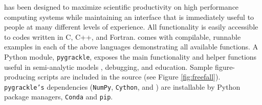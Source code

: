 \grackle{} has been designed to maximize scientific productivity on
high performance computing systems while maintaining an interface that
is immediately useful to people at many different levels of
experience.
All functionality is easily accessible to codes written
in C, C++, and Fortran.  \grackle{} comes with compilable,
runnable examples in each of the above languages demonstrating all
available functions.  A Python module, \texttt{pygrackle},
exposes the main functionality and helper functions useful in
semi-analytic models \citep[e.g.,][]{2016ApJ...820...71C,
  2016MNRAS.459.4209A}, debugging, and education.  Sample
figure-producing scripts are included in the source (see Figure
\ref{fig:freefall}). \texttt{pygrackle's}
dependencies (\texttt{NumPy}, \texttt{Cython}, and \yt{}) are
installable by Python package managers, \texttt{Conda}
and \texttt{pip}.




